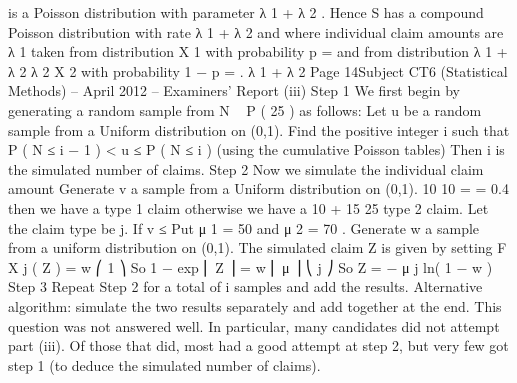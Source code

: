 \documentclass[a4paper,12pt]{article}
\begin{document}
is a Poisson distribution with parameter λ 1 + λ 2 . Hence S has a compound
Poisson distribution with rate λ 1 + λ 2 and where individual claim amounts are
λ 1
taken from distribution X 1 with probability p =
and from distribution
λ 1 + λ 2
λ 2
X 2 with probability 1 − p =
.
λ 1 + λ 2
Page 14Subject CT6 (Statistical Methods) – April 2012 – Examiners’ Report
(iii)
Step 1
We first begin by generating a random sample from N ~ P ( 25 ) as follows:
Let u be a random sample from a Uniform distribution on (0,1).
Find the positive integer i such that P ( N ≤ i − 1 ) < u ≤ P ( N ≤ i ) (using the
cumulative Poisson tables)
Then i is the simulated number of claims.
Step 2
Now we simulate the individual claim amount
Generate v a sample from a Uniform distribution on (0,1).
10
10
=
= 0.4 then we have a type 1 claim otherwise we have a
10 + 15 25
type 2 claim. Let the claim type be j.
If v ≤
Put μ 1 = 50 and μ 2 = 70 . Generate w a sample from a uniform distribution on
(0,1).
The simulated claim Z is given by setting
F X j ( Z ) = w
⎛ 1 ⎞
So 1 − exp ⎜
Z ⎟ = w
⎜ μ
⎟
⎝ j ⎠
So Z = − μ j ln( 1 − w )
Step 3
Repeat Step 2 for a total of i samples and add the results.
Alternative algorithm: simulate the two results separately and add together at
the end.
This question was not answered well. In particular, many candidates did not attempt part
(iii). Of those that did, most had a good attempt at step 2, but very few got step 1 (to deduce
the simulated number of claims).
\end{document}
